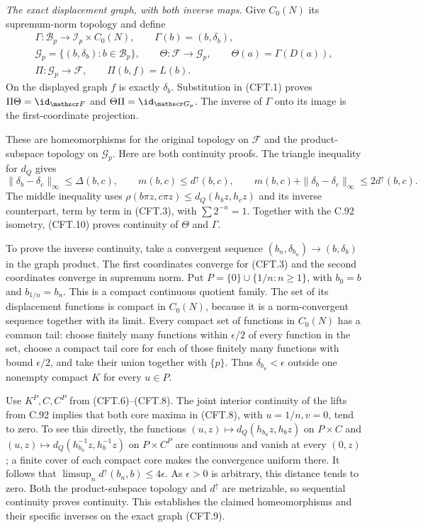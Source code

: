 \emph{The exact displacement graph, with both inverse maps.}
Give $C_0(N)$ its supremum-norm topology and define
\[
\begin{gathered}
 \Gamma:\mathscr B_p\longrightarrow\mathscr I_p\times C_0(N),
                  \qquad \Gamma(b)=(b,\delta_b),\\
 \mathscr G_p=\{(b,\delta_b):b\in\mathscr B_p\},\qquad
 \Theta:\mathscr F\longrightarrow\mathscr G_p,
                  \qquad \Theta(a)=\Gamma(D(a)),\\
 \Pi:\mathscr G_p\longrightarrow\mathscr F,
                  \qquad \Pi(b,f)=L(b).
\end{gathered}                                                  \tag{CFT.9}
\]
On the displayed graph $f$ is exactly $\delta_b$. Substitution
in (CFT.1) proves $\Pi\Theta=\id_{\mathscr F}$ and
$\Theta\Pi=\id_{\mathscr G_p}$. The inverse of $\Gamma$ onto
its image is the first-coordinate projection.

These are homeomorphisms for the original topology on
$\mathscr F$ and the product-subspace topology on $\mathscr G_p$.
Here are both continuity proofs. The triangle inequality for
$d_Q$ gives
\[
 \|\delta_b-\delta_c\|_\infty\leq\Delta(b,c),\qquad
 m(b,c)\leq d^\uparrow(b,c),\qquad
 m(b,c)+\|\delta_b-\delta_c\|_\infty
                       \leq2d^\uparrow(b,c).
                                                               \tag{CFT.10}
\]
The middle inequality uses
$\rho(b\pi z,c\pi z)\leq d_Q(h_bz,h_cz)$ and its inverse
counterpart, term by term in (CFT.3), with $\sum2^{-n}=1$.
Together with the C.92 isometry, (CFT.10) proves continuity
of $\Theta$ and $\Gamma$.

To prove the inverse continuity, take a convergent sequence
$(b_n,\delta_{b_n})\to(b,\delta_b)$ in the graph product.
The first coordinates converge for (CFT.3) and the second
coordinates converge in supremum norm. Put
$P=\{0\}\cup\{1/n:n\geq1\}$, with $b_0=b$ and
$b_{1/n}=b_n$. This is a compact continuous quotient family.
The set of its displacement functions is compact in $C_0(N)$,
because it is a norm-convergent sequence together with its limit.
Every compact set of functions in $C_0(N)$ has a common tail:
choose finitely many functions within $\epsilon/2$ of every
function in the set, choose a compact tail core for each of
those finitely many functions with bound $\epsilon/2$, and
take their union together with $\{p\}$. Thus
$\delta_{b_u}<\epsilon$ outside one nonempty compact $K$
for every $u\in P$.

Use $K^P,C,C^P$ from (CFT.6)--(CFT.8).
The joint interior continuity of the lifts from C.92 implies
that both core maxima in (CFT.8), with $u=1/n,v=0$, tend to
zero. To see this directly, the functions
$(u,z)\mapsto d_Q(h_{b_u}z,h_bz)$ on $P\times C$ and
$(u,z)\mapsto d_Q(h_{b_u}^{-1}z,h_b^{-1}z)$ on $P\times C^P$
are continuous and vanish at every $(0,z)$; a finite cover
of each compact core makes the convergence uniform there.
It follows that
$\limsup_n d^\uparrow(b_n,b)\leq4\epsilon$.
As $\epsilon>0$ is arbitrary, this distance tends to zero.
Both the product-subspace topology and $d^\uparrow$ are
metrizable, so sequential continuity proves continuity.
This establishes the claimed homeomorphisms and their
specific inverses on the exact graph (CFT.9).

